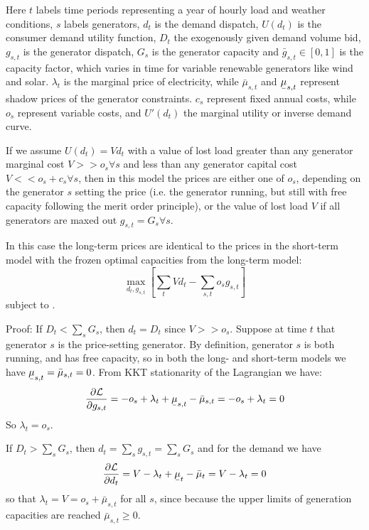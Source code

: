\documentclass[final,3p]{elsarticle}
\def\l{\lambda} \def\K{\kappa} \def\m{\mu} \def\G{\Gamma} \def\d{\partial}
\def\cL{\mathcal{L}} \newcommand{\ubar}[1]{\text{\b{$#1$}}}
\begin{document}
Here $t$ labels time periods representing a year of hourly load and weather
conditions, $s$ labels generators, $d_{t}$ is the demand dispatch, $U(d_t)$ is
the consumer demand utility function, $D_{t}$ the exogenously given demand
volume bid, $g_{s,t}$ is the generator dispatch, $G_s$ is the generator capacity
and $\bar{g}_{s,t}\in[0,1]$ is the capacity factor, which varies in time for
variable renewable generators like wind and solar. $\l_t$ is the marginal price
of electricity, while $\bar{\mu}_{s,t}$ and $\ubar{\mu}_{s,t}$ represent shadow
prices of the generator constraints. $c_s$ represent fixed annual costs, while
$o_s$ represent variable costs, and $U'(d_t)$ the marginal utility or inverse
demand curve.

If we assume $U(d_t)=Vd_t$ with a value of lost load greater than any generator
marginal cost $V >> o_s \forall s$ and less than any generator capital cost $V
<< o_s + c_s \forall s$, then in this model the prices are either one of $o_s$,
depending on the generator $s$ setting the price (i.e. the generator running,
but still with free capacity following the merit order principle), or the value
of lost load $V$ if all generators are maxed out $g_{s,t} = G_s \forall s$.

In this case the long-term prices are identical to the prices in the short-term
model with the frozen optimal capacities from the long-term model:
\begin{equation}
  \max_{d_{t}, g_{s,t}}\left[\sum_{t} V d_{t}  - \sum_{s,t} o_{s} g_{s,t} \right]  \label{eq:objs}
\end{equation}
subject to .

Proof: If $D_t < \sum_s G_{s}$, then $d_t = D_t$ since $V >> o_s$. Suppose at
time $t$ that generator $s$ is the price-setting generator. By definition,
generator $s$ is both running, and has free capacity, so in both the long- and
short-term models we have $\ubar{\mu}_{s,t} = \bar{\mu}_{s,t} = 0$.
From KKT stationarity of the Lagrangian we have:
\begin{align}
  \frac{\d \cL}{\d g_{s,t}} =  -o_s + \l_t + \ubar{\mu}_{s,t} - \bar{\mu}_{s,t}  =  -o_s + \l_t = 0
\end{align}
So $\l_t = o_s$.

If $D_t > \sum_s G_{s}$, then $d_t = \sum_s g_{s,t} = \sum_s G_{s}$ and for the
demand we have
\begin{align}
  \frac{\d \cL}{\d d_{t}} =  V -\l_t + \ubar{\mu}_{t} - \bar{\mu}_{t}  =  V - \l_t = 0
\end{align}
so that $\l_t = V = o_s + \bar{\mu}_{s,t}$ for all $s$, since because the upper
limits of generation capacities are reached $\bar{\mu}_{s,t} \geq 0$.
\end{document}
